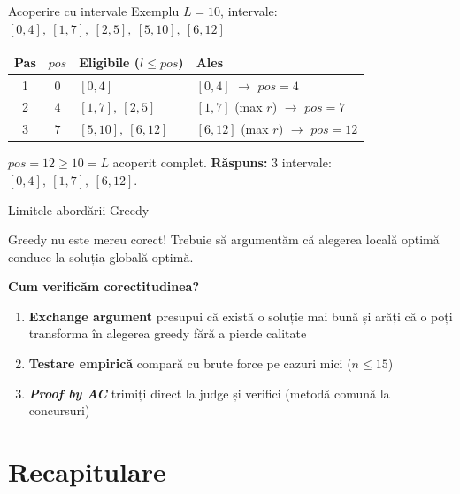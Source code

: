 \documentclass{beamer}
\begin{document}
\begin{frame}{Acoperire cu intervale \textemdash{} Exemplu}
  $L = 10$, intervale:
  $[0,4],\ [1,7],\ [2,5],\ [5,10],\ [6,12]$
  \smallskip
  \begin{center}
  \begin{tabular}{ccll}
    \toprule
    Pas & $\mathit{pos}$ & Eligibile ($l \leq \mathit{pos}$) & Ales \\
    \midrule
    1 & $0$ & $[0,4]$ & $[0,4]$ $\rightarrow$ $\mathit{pos}=4$ \\[3pt]
    2 & $4$ & $[1,7],\ [2,5]$ & $[1,7]$ (max $r$) $\rightarrow$ $\mathit{pos}=7$ \\[3pt]
    3 & $7$ & $[5,10],\ [6,12]$ & $[6,12]$ (max $r$) $\rightarrow$ $\mathit{pos}=12$ \\
    \bottomrule
  \end{tabular}
  \end{center}
  \smallskip
  $\mathit{pos} = 12 \geq 10 = L$ \textemdash{} acoperit complet.
  \smallskip
  \textbf{Răspuns:} $3$ intervale: $[0,4],\ [1,7],\ [6,12]$.
\end{frame}

\begin{frame}{Limitele abordării Greedy}
  \begin{alertblock}{Greedy nu este mereu corect!}
    Trebuie să argumentăm că alegerea locală optimă
    conduce la soluția globală optimă.
  \end{alertblock}
  \smallskip
  \textbf{Cum verificăm corectitudinea?}
  \begin{enumerate}\itemsep8pt
    \item \textbf{Exchange argument} \textemdash{} presupui că există o soluție mai bună
          și arăți că o poți transforma în alegerea greedy fără a pierde calitate
    \item \textbf{Testare empirică} \textemdash{} compară cu brute force pe cazuri
          mici ($n \leq 15$)
    \item \textbf{\textit{Proof by AC}} \textemdash{} trimiți direct la judge
          și verifici (metodă comună la concursuri)
  \end{enumerate}
\end{frame}

\section{Recapitulare}
\end{document}
